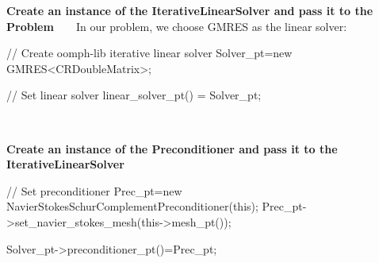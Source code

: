 \begin{DoxyEnumerate}
\item {\bfseries Create an instance of the Iterative\+Linear\+Solver and pass it to the Problem} ~\newline
~\newline
 In our problem, we choose {\ttfamily G\+M\+R\+ES} as the linear solver\+: ~\newline
~\newline
  
\begin{DoxyCodeInclude}
   \textcolor{comment}{// Create oomph-lib iterative linear solver}
   Solver\_pt=\textcolor{keyword}{new} GMRES<CRDoubleMatrix>;
   
   \textcolor{comment}{// Set linear solver}
   linear\_solver\_pt() = Solver\_pt;

\end{DoxyCodeInclude}
 ~\newline
~\newline

\item {\bfseries Create an instance of the Preconditioner and pass it to the Iterative\+Linear\+Solver} ~\newline
~\newline
 
\begin{DoxyCodeInclude}
   \textcolor{comment}{// Set preconditioner}
   Prec\_pt=\textcolor{keyword}{new} NavierStokesSchurComplementPreconditioner(\textcolor{keyword}{this});
   Prec\_pt->set\_navier\_stokes\_mesh(this->mesh\_pt());

   Solver\_pt->preconditioner\_pt()=Prec\_pt;

\end{DoxyCodeInclude}
 ~\newline
~\newline


\end{DoxyEnumerate}
